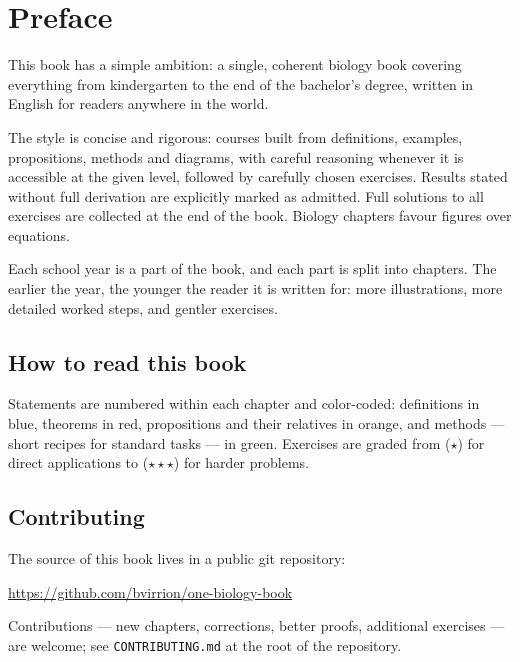 \chapter{Preface}

This book has a simple ambition: a single, coherent biology book
covering everything from kindergarten to the end of the bachelor's degree,
written in English for readers anywhere in the world.

The style is concise and rigorous: courses built from definitions, examples,
propositions, methods and diagrams, with careful reasoning whenever it is
accessible at the given level, followed by carefully chosen exercises.
Results stated without full derivation are explicitly marked as admitted.
Full solutions to all exercises are collected at the end of the book.
Biology chapters favour figures over equations.


Each school year is a part of the book, and each part is split into
chapters. The earlier the year, the younger the reader it is written
for: more illustrations, more detailed worked steps, and gentler
exercises.

\section*{How to read this book}

Statements are numbered within each chapter and color-coded: definitions in
blue, theorems in red, propositions and their relatives in orange, and
methods --- short recipes for standard tasks --- in green. Exercises are
graded from ($\star$) for direct applications to ($\star\star\star$) for
harder problems.

\section*{Contributing}

The source of this book lives in a public git repository:
\begin{center}
\url{https://github.com/bvirrion/one-biology-book}
\end{center}
Contributions --- new chapters, corrections, better proofs, additional
exercises --- are welcome; see \texttt{CONTRIBUTING.md} at the root of the
repository.
